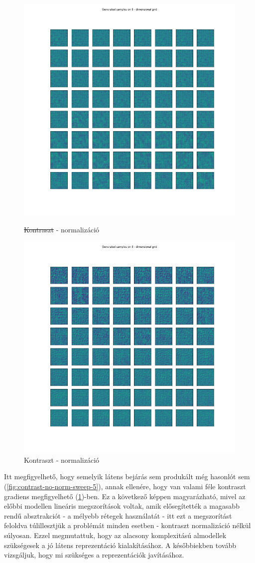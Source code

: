 \documentclass[12pt, english]{article}
\begin{document}
\begin{figure}[H]
  \begin{minipage}{0.5\linewidth}
    \centering
    \includegraphics[width=.62\linewidth]{lvae2/contrast_norm_no_contrast_sweep.png} 
    \caption{\st{Kontraszt} - normalizáció} 
    \label{fig:no-contrast-norm-sweep}
  \end{minipage}%
  \begin{minipage}{0.5\linewidth}
    \centering
    \includegraphics[width=.62\linewidth]{lvae2/contrast_norm_contrast_sweep.png} 
    \caption{Kontraszt - normalizáció} 
    \label{fig:contrast-norm-sweep}
  \end{minipage} 
\end{figure}

\vspace{4mm}

\par Itt megfigyelhető, hogy semelyik látens bejárás sem produkált még hasonlót sem (\ref{fig:contrast-no-norm-sweep-5}), annak ellenére, hogy van valami féle kontraszt gradiens megfigyelhető (\ref{fig:contrast-norm-sweep})-ben. Ez a következő képpen magyarázható, mivel az előbbi modellen lineáris megszorítások voltak, amik elősegítették a magasabb rendű absztrakciót - a mélyebb rétegek használatát - itt ezt a megszorítást feloldva túlillesztjük a problémát minden esetben - kontraszt normalizáció nélkül súlyosan. Ezzel megmutattuk, hogy az alacsony komplexitású almodellek szükségesek a jó látens reprezentáció kialakításához. A későbbiekben tovább vizsgáljuk, hogy mi szükséges a reprezentációk javításához.
\end{document}
